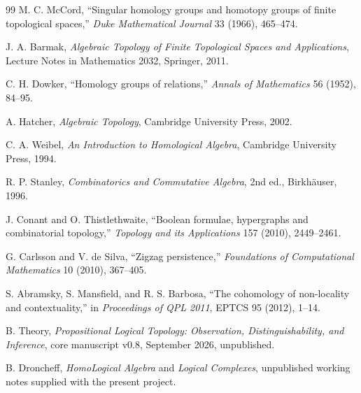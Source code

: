 \documentclass[11pt]{article}
\theoremstyle{definition}
\begin{document}
\begin{thebibliography}{99}
M. C. McCord,
``Singular homology groups and homotopy groups of finite topological spaces,''
\emph{Duke Mathematical Journal} 33 (1966), 465--474.

J. A. Barmak,
\emph{Algebraic Topology of Finite Topological Spaces and Applications},
Lecture Notes in Mathematics 2032, Springer, 2011.

C. H. Dowker,
``Homology groups of relations,''
\emph{Annals of Mathematics} 56 (1952), 84--95.

A. Hatcher,
\emph{Algebraic Topology}, Cambridge University Press, 2002.

C. A. Weibel,
\emph{An Introduction to Homological Algebra}, Cambridge University Press, 1994.

R. P. Stanley,
\emph{Combinatorics and Commutative Algebra}, 2nd ed., Birkh\"auser, 1996.

J. Conant and O. Thistlethwaite,
``Boolean formulae, hypergraphs and combinatorial topology,''
\emph{Topology and its Applications} 157 (2010), 2449--2461.

G. Carlsson and V. de Silva,
``Zigzag persistence,''
\emph{Foundations of Computational Mathematics} 10 (2010), 367--405.

S. Abramsky, S. Mansfield, and R. S. Barbosa,
``The cohomology of non-locality and contextuality,''
in \emph{Proceedings of QPL 2011}, EPTCS 95 (2012), 1--14.

B. Theory,
\emph{Propositional Logical Topology: Observation, Distinguishability, and Inference},
core manuscript v0.8, September 2026, unpublished.

B. Droncheff,
\emph{HomoLogical Algebra} and \emph{Logical Complexes}, unpublished working notes supplied with the present project.
\end{thebibliography}
\end{document}
